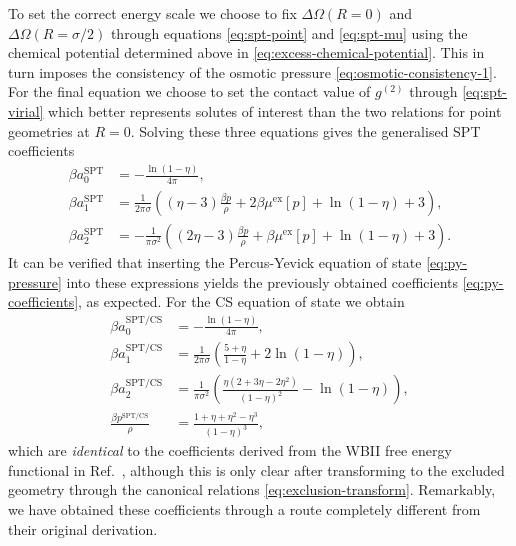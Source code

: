 \documentclass[11pt,twoside]{report}
\begin{document}
To set the correct energy scale we choose to fix $\Delta \Omega(R=0)$ and $\Delta \Omega(R=\sigma/2)$ through equations \eqref{eq:spt-point} and \eqref{eq:spt-mu} using the chemical potential determined above in \eqref{eq:excess-chemical-potential}.
This in turn imposes the consistency of the osmotic pressure \eqref{eq:osmotic-consistency-1}.
For the final equation we choose to set the contact value of $g^{(2)}$ through \eqref{eq:spt-virial} which better represents solutes of interest than the two relations for point geometries at $R=0$.
Solving these three equations gives the generalised SPT coefficients
\begin{subequations}\label{eq:general-spt-coefficients}
  \begin{align}
    \beta a_0^\mathrm{SPT}
    &=
    -\frac{\ln{(1- \eta)}}{4\pi},
    \\
    \beta a_1^\mathrm{SPT}
    &=
    \frac{1}{2\pi\sigma} \left(
    (\eta - 3) \frac{\beta p}{\rho}
    + 2 \beta \mu^\mathrm{ex}[p]
    + \ln{(1 - \eta)}
    + 3
    \right),
    \\
    \beta a_2^\mathrm{SPT}
    &=
    - \frac{1}{\pi \sigma^2} \left(
    (2 \eta - 3) \frac{\beta p}{\rho}
    + \beta \mu^\mathrm{ex}[p]
    + \ln{(1 - \eta)}
    + 3
    \right).
 \end{align}
\end{subequations}
It can be verified that inserting the Percus-Yevick equation of state \eqref{eq:py-pressure} into these expressions yields the previously obtained coefficients \eqref{eq:py-coefficients}, as expected.
For the CS equation of state we obtain
\begin{subequations}\label{eq:cs-spt-coefficients}
  \begin{align}
    \beta a_0^\mathrm{SPT/CS}
    &=
    -\frac{\ln{(1- \eta)}}{4\pi},
    \\
    \beta a_1^\mathrm{SPT/CS}
    &=
    \frac{1}{2\pi\sigma} \left(
    \frac{5 + \eta}{1 - \eta}
    + 2 \ln{(1 - \eta)}
    \right),
    \\
    \beta a_2^\mathrm{SPT/CS}
    &=
    \frac{1}{\pi \sigma^2} \left(
    \frac{\eta (2 + 3\eta - 2\eta^2)}{(1 - \eta)^2}
    - \ln{(1 - \eta)}
    \right),
    \\
    \frac{\beta p^\mathrm{SPT/CS}}{\rho}
    &=
    \frac{1 + \eta + \eta^2 - \eta^3}{(1-\eta)^3},
 \end{align}
\end{subequations}
which are \emph{identical} to the coefficients derived from the WBII free energy functional in Ref.\ \cite{Hansen-GoosJPCM2006}, although this is only clear after transforming to the excluded geometry through the canonical relations \eqref{eq:exclusion-transform}.
Remarkably, we have obtained these coefficients through a route completely different from their original derivation.
\end{document}
